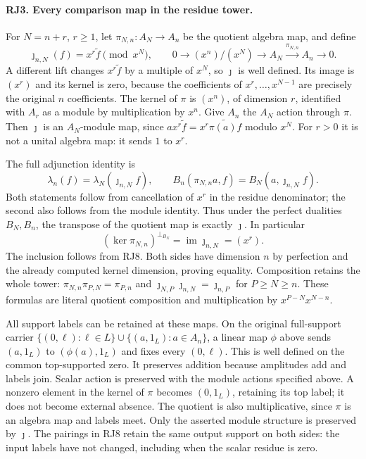 \paragraph{RJ3. Every comparison map in the residue tower.}
For $N=n+r$, $r\ge1$, let $\pi_{N,n}:A_N\to A_n$ be the quotient
algebra map, and define
\[
 \jmath_{n,N}(f)=x^r\widetilde f\pmod{x^N},
 \qquad
 0\longrightarrow (x^n)/(x^N)\longrightarrow A_N
       \xrightarrow{\pi_{N,n}}A_n\longrightarrow0.
 \tag{RJ7}
\]
A different lift changes $x^r\widetilde f$ by a multiple of $x^N$,
so $\jmath$ is well defined. Its image is $(x^r)$ and its kernel is
zero, because the coefficients of $x^r,\ldots,x^{N-1}$ are precisely
the original $n$ coefficients. The kernel of $\pi$ is $(x^n)$,
of dimension $r$, identified with $A_r$ as a module by multiplication
by $x^n$. Give $A_n$ the $A_N$ action through $\pi$. Then
$\jmath$ is an $A_N$-module map, since
$a x^r\widetilde f=x^r\widetilde{\pi(a)f}$ modulo $x^N$.
For $r>0$ it is not a unital algebra map: it sends $1$ to $x^r$.

The full adjunction identity is
\[
 \boxed{\lambda_n(f)=\lambda_N(\jmath_{n,N}f),\qquad
 B_n(\pi_{N,n}a,f)=B_N(a,\jmath_{n,N}f).}
 \tag{RJ8}
\]
Both statements follow from cancellation of $x^r$ in the residue
denominator; the second also follows from the module identity. Thus
under the perfect dualities $B_N,B_n$, the transpose of the quotient
map is exactly $\jmath$. In particular
\[
 (\ker\pi_{N,n})^{\perp_{B_N}}=\operatorname{im}\jmath_{n,N}=(x^r).
 \tag{RJ9}
\]
The inclusion follows from RJ8. Both sides have dimension $n$ by
perfection and the already computed kernel dimension, proving equality.
Composition retains the whole tower:
$\pi_{N,n}\pi_{P,N}=\pi_{P,n}$ and
$\jmath_{N,P}\jmath_{n,N}=\jmath_{n,P}$ for $P\ge N\ge n$.
These formulas are literal quotient composition and multiplication
by $x^{P-N}x^{N-n}$.

All support labels can be retained at these maps. On the original
full-support carrier $\{(0,\ell):\ell\in L\}\cup
\{(a,1_L):a\in A_n\}$, a linear map $\phi$ above sends
$(a,1_L)$ to $(\phi(a),1_L)$ and fixes every $(0,\ell)$.
This is well defined on the common top-supported zero. It preserves
addition because amplitudes add and labels join. Scalar action is
preserved with the module actions specified above. A nonzero element
in the kernel of $\pi$ becomes $(0,1_L)$, retaining its top label;
it does not become external absence. The quotient is also
multiplicative, since $\pi$ is an algebra map and labels meet.
Only the asserted module structure is preserved by $\jmath$.
The pairings in RJ8 retain the same output support on both sides:
the input labels have not changed, including when the scalar residue
is zero.

